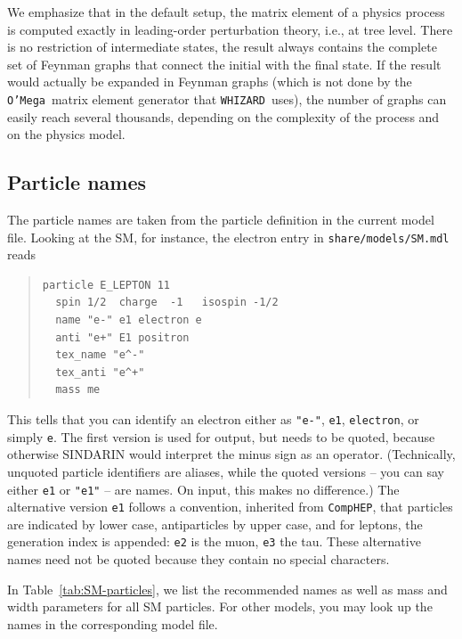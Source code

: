 \documentclass[12pt]{book}
\newcommand{\ttt}[1]{\texttt{#1}}
\newcommand{\whizard}{\texttt{WHIZARD}}
\newcommand{\oMega}{\texttt{O'Mega}}
\newcommand{\comphep}{\texttt{CompHEP}}
\begin{document}
We emphasize that in the default setup, the matrix element of a physics
process is computed exactly in leading-order perturbation theory, i.e., at
tree level.  There is no restriction of intermediate states, the result always
contains the complete set of Feynman graphs that connect the initial with the
final state.  If the result would actually be expanded in Feynman graphs
(which is not done by the \oMega\ matrix element generator that
\whizard\ uses), the number of graphs can easily reach several thousands,
depending on the complexity of the process and on the physics model.


\subsection{Particle names}

The particle names are taken from the particle definition in the current model
file.  Looking at the SM, for instance, the electron entry in
\ttt{share/models/SM.mdl} reads
\begin{quote}
\begin{footnotesize}
\begin{verbatim}
particle E_LEPTON 11
  spin 1/2  charge  -1   isospin -1/2  
  name "e-" e1 electron e
  anti "e+" E1 positron 
  tex_name "e^-"
  tex_anti "e^+"
  mass me
\end{verbatim}
\end{footnotesize}
\end{quote}
This tells that you can identify an electron either as \verb|"e-"|, \verb|e1|,
\verb|electron|, or simply \verb|e|.  The first version is used for output,
but needs to be quoted, because otherwise SINDARIN would interpret the minus
sign as an operator.  (Technically, unquoted particle identifiers are aliases,
while the quoted versions -- you can say either \verb|e1| or \verb|"e1"| --
are names.  On input, this makes no difference.)  The alternative version
\verb|e1| follows a convention, inherited from \comphep, that particles are
indicated by lower case, antiparticles by upper case, and for leptons, the
generation index is appended: \verb|e2| is the muon, \verb|e3| the tau.  These
alternative names need not be quoted because they contain no special
characters.  

In Table~\ref{tab:SM-particles}, we list the recommended names as well as
mass and width parameters for all SM particles.  For other models, you may
look up the names in the corresponding model file.
\end{document}
